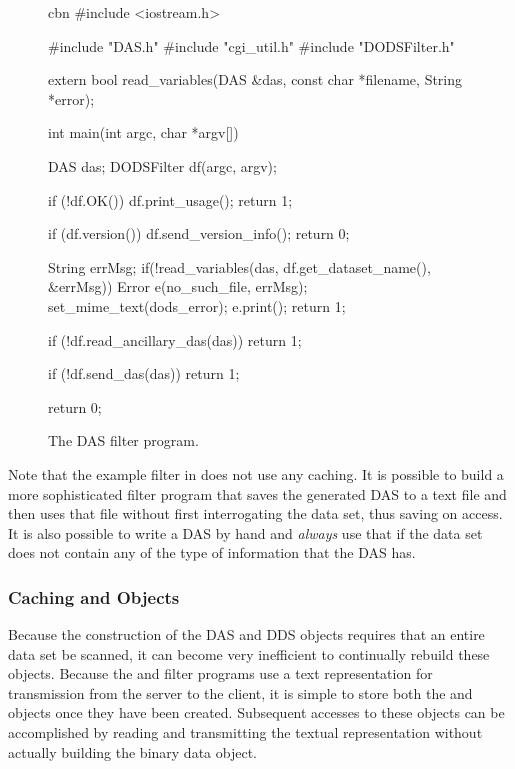 \begin{figure}[htbp]
\begin{vcode}{cbn}
#include <iostream.h>

#include "DAS.h"
#include "cgi_util.h"
#include "DODSFilter.h"

extern bool read_variables(DAS &das, 
        const char *filename, String *error);

int 
main(int argc, char *argv[])
{
    DAS das;
    DODSFilter df(argc, argv);

    if (!df.OK()) {
        df.print_usage();
        return 1;
    }

    if (df.version()) {
        df.send_version_info();
        return 0;
    }

    String errMsg;
    if(!read_variables(das, df.get_dataset_name(), &errMsg)){
      Error e(no_such_file, errMsg);
      set_mime_text(dods_error);
      e.print();
      return 1;
    }

    if (!df.read_ancillary_das(das))
        return 1;

    if (!df.send_das(das))
        return 1;

    return 0;
}
\end{vcode}
\caption{The DAS filter program.}
\label{fig,das-filter}
\end{figure}

Note that the example filter in  does not
use any caching. It is possible to build a more sophisticated filter
program that saves the generated DAS to a text file and then uses that
file without first interrogating the data set, thus saving on access.
It is also possible to write a DAS by hand and \emph{always} use that
if the data set does not contain any of the type of information that
the DAS has.

\pagebreak
\subsubsection{Caching  and  Objects}

Because the construction of the DAS and DDS objects requires that an
entire data set be scanned, it can become very inefficient to
continually rebuild these objects. Because the  and
 filter programs use a text representation for transmission
from the server to the client, it is simple to store both the
 and  objects once they have been created.
Subsequent accesses to these objects can be accomplished by reading
and transmitting the textual representation without actually building
the binary data object.

